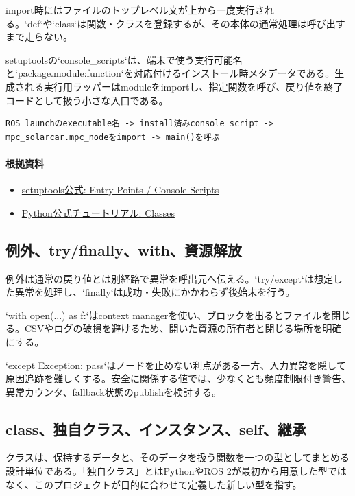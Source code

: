 \documentclass[a4paper,11pt]{article}
\begin{document}
import時にはファイルのトップレベル文が上から一度実行される。`def`や`class`は関数・クラスを登録するが、その本体の通常処理は呼び出すまで走らない。


setuptoolsの`console\_scripts`は、端末で使う実行可能名と`package.module:function`を対応付けるインストール時メタデータである。生成される実行用ラッパーはmoduleをimportし、指定関数を呼び、戻り値を終了コードとして扱う小さな入口である。


\begin{lstlisting}
ROS launchのexecutable名 -> install済みconsole script -> mpc_solarcar.mpc_nodeをimport -> main()を呼ぶ
\end{lstlisting}

\paragraph{根拠資料}
\begin{itemize}[leftmargin=1.6em]
\item \href{https://setuptools.pypa.io/en/latest/userguide/entry_point.html}{setuptools公式: Entry Points / Console Scripts}
\item \href{https://docs.python.org/3/tutorial/classes.html}{Python公式チュートリアル: Classes}
\end{itemize}

\subsection{例外、try/finally、with、資源解放}
例外は通常の戻り値とは別経路で異常を呼出元へ伝える。`try/except`は想定した異常を処理し、`finally`は成功・失敗にかかわらず後始末を行う。


`with open(...) as f:`はcontext managerを使い、ブロックを出るとファイルを閉じる。CSVやログの破損を避けるため、開いた資源の所有者と閉じる場所を明確にする。


`except Exception: pass`はノードを止めない利点がある一方、入力異常を隠して原因追跡を難しくする。安全に関係する値では、少なくとも頻度制限付き警告、異常カウンタ、fallback状態のpublishを検討する。



\subsection{class、独自クラス、インスタンス、self、継承}
クラスは、保持するデータと、そのデータを扱う関数を一つの型としてまとめる設計単位である。「独自クラス」とはPythonやROS 2が最初から用意した型ではなく、このプロジェクトが目的に合わせて定義した新しい型を指す。
\end{document}
